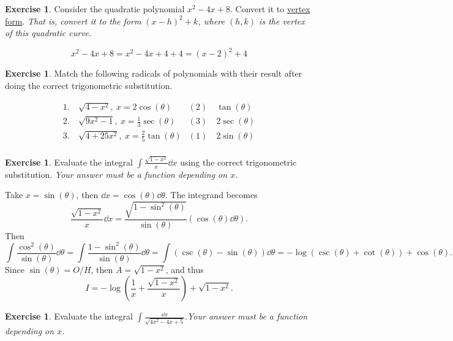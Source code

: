 \documentclass[12pt]{article}
\theoremstyle{plain}
\theoremstyle{definition}
\newtheorem{Ej}[Th]{Exercise}         %
\theoremstyle{remark}
\newcommand{\te}{\theta}                %
\renewcommand{\:}{\colon}           %
\newcommand{\un}[1]{\underline{#1}}
\renewcommand{\.}{\Cdot}                %
\begin{document}

\begin{Ej}
  Consider the quadratic polynomial $x^2-4x+8$. Convert it to \un{vertex form}. \emph{That is, convert it to the form $(x-h)^2+k$, where $(h,k)$ is the vertex of this quadratic curve.}
\end{Ej}

\begin{ptcb}
  $$x^2-4x+8=x^2-4x+4+4=(x-2)^2+4$$
  \end{ptcb}

  \begin{Ej}
    Match the following radicals of polynomials with their result after doing the correct trigonometric substitution. 
  \end{Ej}
  
  
  \begin{ptcb}
\begin{align*}
      1.&\ \sqrt{4-x^2},\ x=2\cos(\te)&(2)&\ \tan(\te)\\
      2.&\ \sqrt{9x^2-1},\ x=\frac13\sec(\te)&(3)&\ 2\sec(\te)\\
      3.&\ \sqrt{4+25x^2},\ x=\frac25\tan(\te)&(1)&\ 2\sin(\te)\\
\end{align*}
\vspace*{-0.9cm}
    \end{ptcb}
  
    \begin{Ej}
Evaluate the integral $\displaystyle\int\frac{\sqrt{1-x^2}}{x}\dd x$ using the correct trigonometric substitution. \emph{Your answer must be a function depending on $x$.}
    \end{Ej}
    
    
    \begin{ptcb}
      Take $x=\sin(\te)$, then $\dd x=\cos(\te)\dd\te$. The integrand becomes 
      $$\frac{\sqrt{1-x^2}}{x}\dd x=\frac{\sqrt{1-\sin^2(\te)}}{\sin(\te)}(\cos(\te)\dd\te).$$
      Then 
      $$\int\frac{\cos^2(\te)}{\sin(\te)}\dd \te=\int\frac{1-\sin^2(\te)}{\sin(\te)}\dd \te=\int(\csc(\te)-\sin(\te))\dd \te=-\log(\csc(\te)+\cot(\te))+\cos(\te).$$
      Since $\sin(\te)=O/H$, then $A=\sqrt{1-x^2}$, and thus
      $$I=-\log\left(\frac{1}{x}+\frac{\sqrt{1-x^2}}{x}\right)+\sqrt{1-x^2}.$$
      \end{ptcb}
    
      
    \begin{Ej}
      Evaluate the integral $\displaystyle\int \frac{\dd x}{\sqrt{4x^2-4x+5}}$.\emph{Your answer must be a function depending on $x$.} 
          \end{Ej}
          
\end{document}
